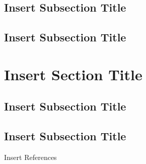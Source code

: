 \documentclass[12pt,a4paper,oneside]{book}
\theoremstyle{plain}
\numberwithin{equation}{chapter}
\begin{document}
\subsection{Insert Subsection Title}\label{sub3.1.1}
\subsection{Insert Subsection Title}\label{sub3.1.2}

\section{Insert Section Title}\label{Sec3.2}
\subsection{Insert Subsection Title}\label{sub3.2.1}
\subsection{Insert Subsection Title}\label{sub3.2.2}

\begin{thebibliography}{99}

Insert References
\end{thebibliography}
\end{document}
